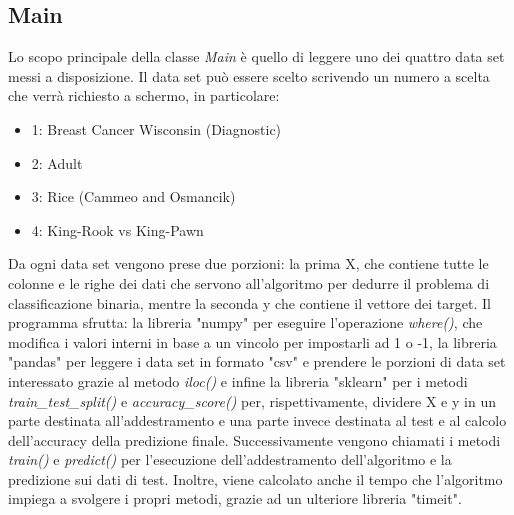 \documentclass{article}
\begin{document}
    \subsection{Main}
	Lo scopo principale della classe \textit{Main} è quello di leggere uno dei quattro data set messi a disposizione. 
	Il data set può essere scelto scrivendo un numero a scelta che verrà richiesto a schermo, in particolare:
	\begin{itemize}
		\item 1: Breast Cancer Wisconsin (Diagnostic)
		\item 2: Adult
		\item 3: Rice (Cammeo and Osmancik)
		\item 4: King-Rook vs King-Pawn
	\end{itemize}
    Da ogni data set vengono prese due porzioni: la prima X, che contiene tutte le colonne e le righe dei dati che servono all'algoritmo per dedurre il problema di classificazione binaria, mentre la seconda y che contiene il vettore dei target. Il programma sfrutta: la libreria "numpy" per eseguire l'operazione \textit{where()}, che modifica i valori interni in base a un vincolo per impostarli ad 1 o -1, la libreria "pandas" per leggere i data set in formato "csv" e prendere le porzioni di data set interessato grazie al metodo \textit{iloc()} e infine la libreria "sklearn" per i metodi \textit{train\_test\_split()} e \textit{accuracy\_score()} per, rispettivamente, dividere X e y in un parte destinata all'addestramento e una parte invece destinata al test e al calcolo dell'accuracy della predizione finale.
	Successivamente vengono chiamati i metodi \textit{train()} e \textit{predict()} per l'esecuzione dell'addestramento dell'algoritmo e la predizione sui dati di test. Inoltre, viene calcolato anche il tempo che l'algoritmo impiega a svolgere i propri metodi, grazie ad un ulteriore libreria "timeit".
\end{document}
